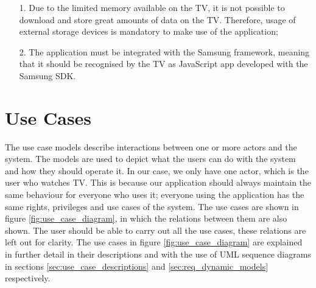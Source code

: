 \begin{itemize}
\item[1.] Due to the limited memory available on the TV, it is not
possible to download and store great amounts of data on the TV.
Therefore, usage of external storage devices is mandatory to make use
of the application;

\item[2.] The application must be integrated with the Samsung
framework, meaning that it should be recognised by the TV as
JavaScript app developed with the Samsung SDK.
\end{itemize}

\section{Use Cases}
\label{sec:use_cases}
The use case models describe interactions between one or more actors and the system.
The models are used to depict what the users can do with the system and how they  should operate it.
In our case, we only have one actor, which is the user who watches TV. This is because our application should always
maintain the same behaviour for everyone who uses it; everyone using the application has the same rights, privileges
and use cases of the system. The use cases are shown in figure \ref{fig:use_case_diagram},
in which the relations between them are also shown. The user should be able to carry out all the use cases,
these relations are left out for clarity. The use cases in figure \ref{fig:use_case_diagram}
are explained in further detail in their descriptions and with the use of UML sequence diagrams in sections
\hyperref[sec:use_case_descriptions]{\ref*{sec:use_case_descriptions}} and
\hyperref[sec:req_dynamic_models]{\ref*{sec:req_dynamic_models}} respectively.

